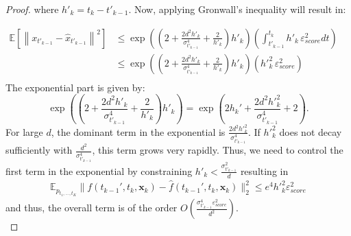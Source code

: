 \documentclass[10pt,a4paper]{amsart}
\def\rvx{{\mathbf{x}}}
\newcommand{\E}{\mathbb{E}}
\begin{document}
\begin{proof}
\noindent
where $h'_k = t_k-t'_{k-1}$. Now, applying Gronwall's inequality will result in:

\begin{align*}
\mathbb{E}\left[\left\| x_{t'_{k-1}} - \hat{x}_{t'_{k-1}} \right\|^2\right]
& \leq \exp\left(\left(2 + \frac{2d^2h'_k}{\sigma_{t'_{k-1}}^4} +  \frac{2}{h'_k} \right)h'_k\right)\left(  \int_{t'_{k-1}}^{t_k}  h'_{k}\, \varepsilon^2_{score} dt \right) \quad  \\
&\leq \exp\left(\left(2 + \frac{2d^2h'_k}{\sigma_{t'_{k-1}}^4} +  \frac{2}{h'_k} \right)h'_k\right)\left(    h'^2_{k}\, \varepsilon^2_{score} \right) \quad \\
\end{align*}
The exponential part is given by:
\[
 \exp\left(\left(2 + \frac{2d^2h'_k}{\sigma_{t'_{k-1}}^4} +  \frac{2}{h'_k} \right)h'_k\right) = \exp\left(2h_k' +  \frac{2d^2h'^2_k}{\sigma_{t'_{k-1}}^4} + 2\right).
\]
For large \( d \), the dominant term in the exponential is \( \frac{2d^2h'^2_k}{\sigma_{t'_{k-1}}^4} \). If \( h'^2_k \) does not decay sufficiently with \(\frac{d^2}{\sigma_{t'_{k-1}}^4} \), this term grows very rapidly. Thus, we need to control the first term in the exponential by constraining $h'_k < \frac{\sigma_{t'_{k-1}}^2}{d}$ resulting in
\begin{align}
    \E_{p_{t_1,...,t_K}}  
  \|
  f(t_{k-1}',t_k,{\rvx}_k)-\hat{f}(t_{k-1}',t_k,{\rvx}_k)\|_2^2 \leq e^4 {h'}_k^2\varepsilon^2_{score}
\end{align}
and thus,  the overall term is of the order ${O}(\frac{\sigma_{t'_{k-1}}^4\varepsilon^2_{score}}{d^2})$. \\


\end{proof}
\end{document}
